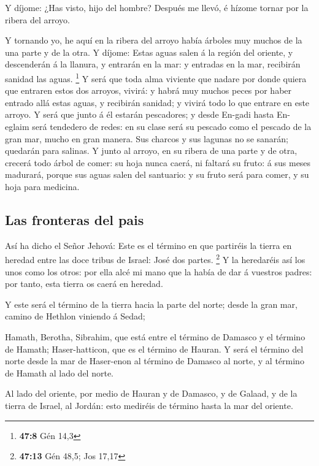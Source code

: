  Y díjome: ¿Has visto, hijo del hombre? Después me llevó, é
hízome tornar por la ribera del arroyo.

 Y tornando yo, he aquí en la ribera del arroyo había
árboles muy muchos de la una parte y de la otra.  Y díjome:
Estas aguas salen á la región del oriente, y descenderán á la llanura, y
entrarán en la mar: y entradas en la mar, recibirán sanidad las aguas.
\footnote{\textbf{47:8} Gén 14,3}  Y será que toda alma
viviente que nadare por donde quiera que entraren estos dos arroyos,
vivirá: y habrá muy muchos peces por haber entrado allá estas aguas, y
recibirán sanidad; y vivirá todo lo que entrare en este arroyo.
 Y será que junto á él estarán pescadores; y desde En-gadi
hasta En-eglaim será tendedero de redes: en su clase será su pescado
como el pescado de la gran mar, mucho en gran manera.  Sus
charcos y sus lagunas no se sanarán; quedarán para salinas.
 Y junto al arroyo, en su ribera de una parte y de otra,
crecerá todo árbol de comer: su hoja nunca caerá, ni faltará su fruto: á
sus meses madurará, porque sus aguas salen del santuario: y su fruto
será para comer, y su hoja para medicina.

\hypertarget{las-fronteras-del-pais}{%
\subsection{Las fronteras del pais}\label{las-fronteras-del-pais}}

 Así ha dicho el Señor Jehová: Este es el término en que
partiréis la tierra en heredad entre las doce tribus de Israel: José dos
partes. \footnote{\textbf{47:13} Gén 48,5; Jos 17,17}  Y la
heredaréis así los unos como los otros: por ella alcé mi mano que la
había de dar á vuestros padres: por tanto, esta tierra os caerá en
heredad.

 Y este será el término de la tierra hacia la parte del
norte; desde la gran mar, camino de Hethlon viniendo á Sedad;

 Hamath, Berotha, Sibrahim, que está entre el término de
Damasco y el término de Hamath; Haser-hatticon, que es el término de
Hauran.  Y será el término del norte desde la mar de
Haser-enon al término de Damasco al norte, y al término de Hamath al
lado del norte.

 Al lado del oriente, por medio de Hauran y de Damasco, y
de Galaad, y de la tierra de Israel, al Jordán: esto mediréis de término
hasta la mar del oriente.

